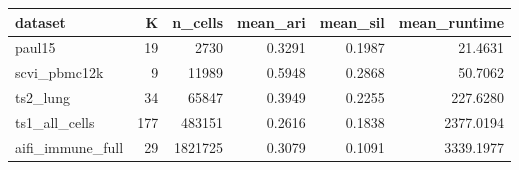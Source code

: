\begin{tabular}{lrrrrr}
\toprule
dataset & K & n\_cells & mean\_ari & mean\_sil & mean\_runtime \\
\midrule
paul15 & 19 & 2730 & 0.3291 & 0.1987 & 21.4631 \\
scvi\_pbmc12k & 9 & 11989 & 0.5948 & 0.2868 & 50.7062 \\
ts2\_lung & 34 & 65847 & 0.3949 & 0.2255 & 227.6280 \\
ts1\_all\_cells & 177 & 483151 & 0.2616 & 0.1838 & 2377.0194 \\
aifi\_immune\_full & 29 & 1821725 & 0.3079 & 0.1091 & 3339.1977 \\
\bottomrule
\end{tabular}
